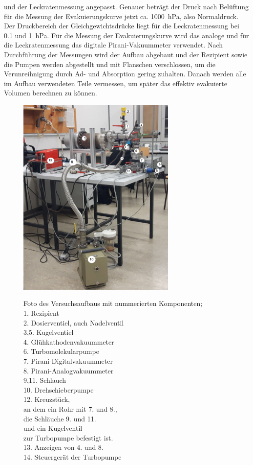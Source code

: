 und der Leckratenmessung angepasst. Genauer beträgt der Druck nach Belüftung für die 
Messung der Evakuierungskurve jetzt ca. \SI{1000}{\hecto\pascal}, also Normaldruck. Der 
Druckbereich der Gleichgewichtsdrücke liegt für die Leckratenmessung bei \SI{0.1}{} und 
\SI{1}{\hecto\pascal}. Für die Messung der Evakuierungskurve wird das analoge und für 
die Leckratenmessung das digitale Pirani-Vakuummeter verwendet. 
\newline
\newline
Nach Durchführung der Messungen wird der Aufbau abgebaut und der Rezipient sowie die Pumpen 
werden abgestellt und mit Flanschen verschlossen, um die Verunreihnigung durch Ad- und Absorption 
gering zuhalten. Danach werden alle im Aufbau verwendeten Teile vermessen, um später das effektiv 
evakuierte Volumen berechnen zu können.
\begin{figure}
  \caption[justification=raggedleft]{Foto des Versuchsaufbaus mit nummerierten Komponenten; \\
1. Rezipient\\
2. Dosierventiel, auch Nadelventil\\
3,5. Kugelventiel \\
4. Glühkathodenvakuummeter\\
6. Turbomolekularpumpe\\
7. Pirani-Digitalvakuummeter\\
8. Pirani-Analogvakuummeter\\
9,11. Schlauch\\
10. Drehschieberpumpe\\
12. Kreuzstück, \\
an dem ein Rohr mit 7. und 8., \\
die Schläuche 9. und 11.\\
 und ein Kugelventil \\
 zur Turbopumpe befestigt ist.\\
13. Anzeigen von 4. und 8. \\
14. Steuergerät der Turbopumpe \\
}
  \includegraphics[height  = 10cm]{pics/V3B2.jpg}
  \label{fig:Aufbau}
\end{figure}


